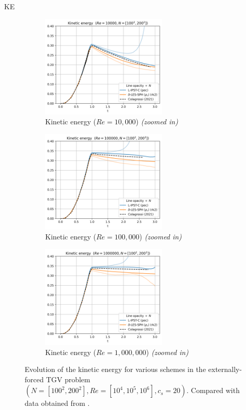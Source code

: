 KE 
\begin{figure}[htbp!]
  \begin{subfigure}{7cm}
  \centering\includegraphics[width=6cm]{Code-Figures/ext-force-tgv/limit_ke_re_10000.png}
  \caption{Kinetic energy ($Re = 10,000$) \textit{(zoomed in)}}
  \end{subfigure}
  \begin{subfigure}{7cm}
  \centering\includegraphics[width=6cm]{Code-Figures/ext-force-tgv/limit_ke_re_100000.png}
  \caption{Kinetic energy ($Re = 100,000$) \textit{(zoomed in)}}
  \end{subfigure}
  \begin{subfigure}{7cm}
  \centering\includegraphics[width=6cm]{Code-Figures/ext-force-tgv/limit_ke_re_1000000.png}
  \caption{Kinetic energy ($Re = 1,000,000$) \textit{(zoomed in)}}
  \end{subfigure}
  \caption{Evolution of the kinetic energy for various schemes in the externally-forced TGV problem $(N=[100^2, 200^2], Re=[10^4, 10^5, 10^6], c_s=20)$. Compared with data obtained from \cite{Colagrossi2021QuasiLagrangian}.}
  \label{fig:tgv-forced-ke}
\end{figure}


